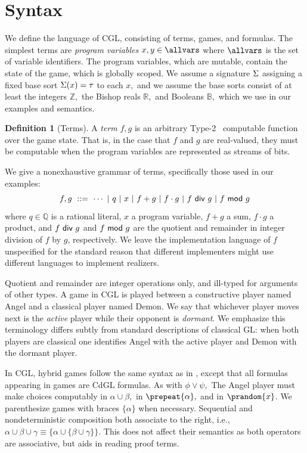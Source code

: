 \documentclass[12pt]{cmuthesis}
\theoremstyle{definition}
\newtheorem{definition}{Definition}
\theoremstyle{remark}
\newcommand{\bebecomes}{\mathrel{::=}}
\newcommand{\alternative}{~|~}
\newcommand{\rref}[2][]{\prettyref{#2}}
\newcommand{\CGL}{\textsf{CGL}\xspace}
\newcommand{\CdGL}{\textsf{CdGL}\xspace}
\newcommand{\GL}{GL\xspace}
\begin{document}
\section{Syntax}
We define the language of \CGL, consisting of terms, games, and formulas.
The simplest terms are \emph{program variables} $x, y \in \allvars$ where $\allvars$ is the set of variable identifiers.
The program variables, which are mutable, contain the state of the game, which is globally scoped.
We assume a signature $\Sigma$ assigning a fixed base sort $\Sigma(x) = \tau$ to each $x,$ and we assume the base sorts consist of at least the integers $\mathbb{Z},$ the Bishop reals $\mathbb{R},$ and Booleans $\mathbb{B},$ which we use in our examples and semantics.
\begin{definition}[Terms]
A \emph{term} $f, g$ is an arbitrary Type-2~\cite{DBLP:series/txtcs/Weihrauch00} computable function over the game state.
That is, in the case that $f$ and $g$ are real-valued, they must be computable when the program variables are represented as streams of bits.

We give a nonexhaustive grammar of terms, specifically those used in our examples:
\[f,g ~\bebecomes~  \cdots \alternative q \alternative x \alternative f + g \alternative f \cdot g \alternative \ediv{f}{g} \alternative \emod{f}{g}\]
where $q \in \mathbb{Q}$ is a rational literal, $x$ a program variable, $f + g$ a sum, $f \cdot g$ a product, and $f~\textsf{div}~g$ and $f~\textsf{mod}~g$ are the quotient and remainder in integer division of $f$ by $g$, respectively.
We leave the implementation language of $f$ unspecified for the standard reason that different implementers might use different languages to implement realizers.
\label{def:terms}
 \end{definition}
Quotient and remainder are integer operations only, and ill-typed for arguments of other types.
A game in \CGL is played between a constructive player named Angel and a classical player named Demon.
We say that whichever player moves next is the \emph{active} player while their opponent is  \emph{dormant}.
We emphasize this terminology differs subtly from standard descriptions of classical \GL: when both players are classical one identifies Angel with the active player and Demon with the dormant player.

In \CGL, hybrid games follow the same syntax as in \dGL, except that all formulas appearing in games are \CdGL formulas.
As with $\phi \lor \psi,$ The Angel player must make choices computably in $\alpha \cup \beta,$ in $\prepeat{\alpha},$ and in $\prandom{x}$.
We parenthesize games with braces $\{ \alpha \}$ when necessary.
Sequential and nondeterministic composition both associate to the right, i.e., $\alpha \cup \beta \cup \gamma \equiv \{\alpha \cup \{\beta \cup \gamma\}\}$.
This does not affect their semantics as both operators are associative, but aids in reading proof terms.
\end{document}
